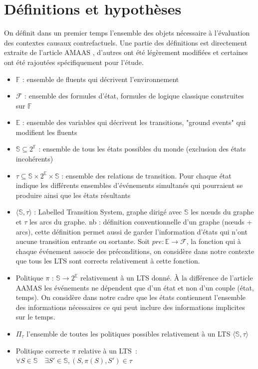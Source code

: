 
\section{Définitions et hypothèses}\label{def}
On définit dans un premier temps l'ensemble des objets nécessaire à l'évaluation des contextes causaux contrefactuels. Une partie des définitions est directement extraite de l'article AMAAS \cite{sarmiento_formalising_2025}, d'autres ont été légèrement modifiées et certaines ont été rajoutées spécifiquement pour l'étude.
\begin{itemize}
    \item $\mathds{F}$ : ensemble de fluents qui décrivent l’environnement
    \item $\mathcal{F}$ : ensemble des formules d'état, formules de logique classique construites sur $\mathds{F}$
    \item $\mathds{E}$ : ensemble des variables qui décrivent les transitions, "ground events" qui modifient les fluents
    \item $\mathds{S} \subseteq 2^{\mathds{F}}$ : ensemble de tous les états possibles du monde (exclusion des états incohérents) 
    \item $\tau \subseteq \mathds{S} \times 2^{\mathds{E}} \times \mathds{S}$ : ensemble des relations de transition. Pour chaque état indique les différents ensembles d'événements simultanés qui pourraient se produire ainsi que les états résultants
    \item $\langle\mathds{S}, \tau\rangle$ : Labelled Transition System, graphe dirigé avec $\mathds{S}$ les nœuds du graphe et $\tau$ les arcs du graphe. nb : définition conventionnelle d'un graphe (nœuds + arcs), cette définition permet aussi de garder l'information d'états qui n'ont aucune transition entrante ou sortante. Soit $pre: \mathds{E}\to \mathcal{F}$, la fonction qui à chaque événement associe des préconditions, on considère dans notre contexte que tous les LTS sont corrects relativement à cette fonction.
    
    \item Politique $\pi$ : $\mathds{S} \to 2^{\mathds{E}}$ relativement à un LTS donné. À la différence de l'article AAMAS les événements ne dépendent que d'un état et non d'un couple (état, temps). On considère dans notre cadre que les états contiennent l'ensemble des informations nécessaires ce qui peut inclure des informations implicites sur le temps.

    \item $\Pi_\tau$ l'ensemble de toutes les politiques possibles relativement à un LTS $\langle\mathds{S},\tau\rangle$
    \item Politique correcte $\pi$ relative à un LTS : $\forall S \in \mathds{S} \quad \exists S'\in \mathds{S}, (S, \pi(S),S')\in \tau$


\end{itemize}
